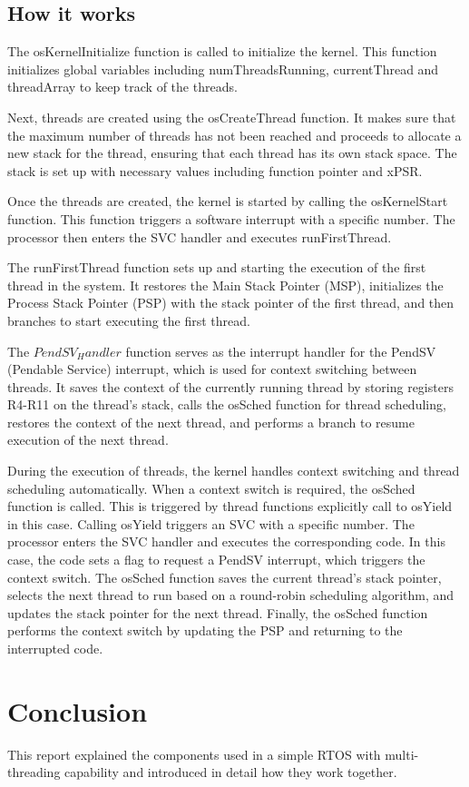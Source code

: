\documentclass{article}
\begin{document}
\subsection{How it works}

The osKernelInitialize function is called to initialize the kernel. This function initializes global variables including numThreadsRunning, currentThread and threadArray to keep track of the threads.

Next, threads are created using the osCreateThread function.  It makes sure that the maximum number of threads has not been reached and proceeds to allocate a new stack for the thread, ensuring that each thread has its own stack space. The stack is set up with necessary values including function pointer and xPSR.

Once the threads are created, the kernel is started by calling the osKernelStart function. This function triggers a software interrupt with a specific number. The processor then enters the SVC handler and executes runFirstThread. 

The runFirstThread function sets up and starting the execution of the first thread in the system. It restores the Main Stack Pointer (MSP), initializes the Process Stack Pointer (PSP) with the stack pointer of the first thread, and then branches to start executing the first thread.

The $PendSV_Handler$ function serves as the interrupt handler for the PendSV (Pendable Service) interrupt, which is used for context switching between threads. It saves the context of the currently running thread by storing registers R4-R11 on the thread's stack, calls the osSched function for thread scheduling, restores the context of the next thread, and performs a branch to resume execution of the next thread.

During the execution of threads, the kernel handles context switching and thread scheduling automatically. When a context switch is required, the osSched function is called. This is triggered by thread functions explicitly call to osYield in this case. Calling osYield triggers an SVC with a specific number. The processor enters the SVC handler and executes the corresponding code. In this case, the code sets a flag to request a PendSV interrupt, which triggers the context switch. The osSched function saves the current thread's stack pointer, selects the next thread to run based on a round-robin scheduling algorithm, and updates the stack pointer for the next thread. Finally, the osSched function performs the context switch by updating the PSP and returning to the interrupted code.

\section{Conclusion}

This report explained the components used in a simple RTOS with multi-threading capability and introduced in detail how they work together.
\end{document}
